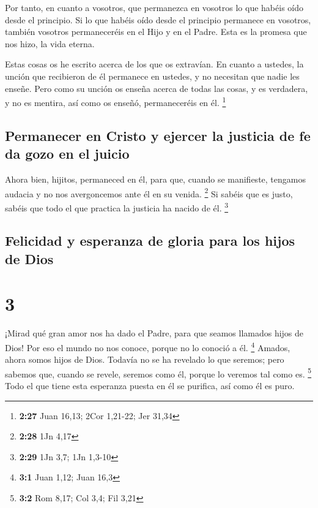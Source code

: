  Por tanto, en cuanto a vosotros, que permanezca en
vosotros lo que habéis oído desde el principio. Si lo que habéis oído
desde el principio permanece en vosotros, también vosotros permaneceréis
en el Hijo y en el Padre.  Esta es la promesa que nos
hizo, la vida eterna.

 Estas cosas os he escrito acerca de los que os
extravían.  En cuanto a ustedes, la unción que recibieron
de él permanece en ustedes, y no necesitan que nadie les enseñe. Pero
como su unción os enseña acerca de todas las cosas, y es verdadera, y no
es mentira, así como os enseñó, permaneceréis en él. \footnote{\textbf{2:27}
  Juan 16,13; 2Cor 1,21-22; Jer 31,34}

\hypertarget{permanecer-en-cristo-y-ejercer-la-justicia-de-fe-da-gozo-en-el-juicio}{%
\subsection{Permanecer en Cristo y ejercer la justicia de fe da gozo en
el
juicio}\label{permanecer-en-cristo-y-ejercer-la-justicia-de-fe-da-gozo-en-el-juicio}}

 Ahora bien, hijitos, permaneced en él, para que, cuando
se manifieste, tengamos audacia y no nos avergoncemos ante él en su
venida. \footnote{\textbf{2:28} 1Jn 4,17}  Si sabéis que
es justo, sabéis que todo el que practica la justicia ha nacido de él.
\footnote{\textbf{2:29} 1Jn 3,7; 1Jn 1,3-10}

\hypertarget{felicidad-y-esperanza-de-gloria-para-los-hijos-de-dios}{%
\subsection{Felicidad y esperanza de gloria para los hijos de
Dios}\label{felicidad-y-esperanza-de-gloria-para-los-hijos-de-dios}}

\hypertarget{section-2}{%
\section{3}\label{section-2}}

 ¡Mirad qué gran amor nos ha dado el Padre, para que
seamos llamados hijos de Dios! Por eso el mundo no nos conoce, porque no
lo conoció a él. \footnote{\textbf{3:1} Juan 1,12; Juan 16,3}
 Amados, ahora somos hijos de Dios. Todavía no se ha
revelado lo que seremos; pero sabemos que, cuando se revele, seremos
como él, porque lo veremos tal como es. \footnote{\textbf{3:2} Rom 8,17;
  Col 3,4; Fil 3,21}  Todo el que tiene esta esperanza
puesta en él se purifica, así como él es puro.

